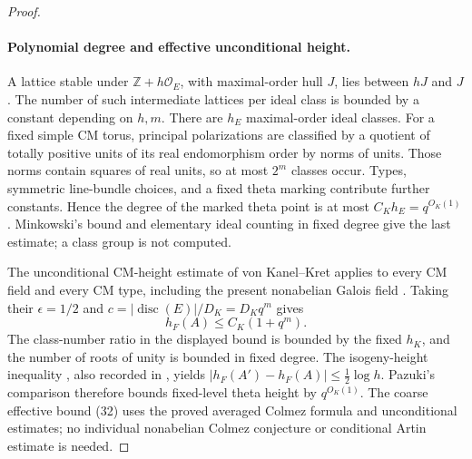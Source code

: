 \documentclass[11pt]{article}
\theoremstyle{definition}
\theoremstyle{remark}
\begin{document}
\begin{proof}
\paragraph{Polynomial degree and effective unconditional height.}
A lattice stable under $\mathbb Z+h\mathcal O_E$, with maximal-order hull
$J$, lies between $hJ$ and $J$.  The number of such intermediate lattices
per ideal class is bounded by a constant depending on $h,m$.  There are
$h_E$ maximal-order ideal classes.  For a fixed simple CM torus, principal
polarizations are classified by a quotient of totally positive units of its
real endomorphism order by norms of units.  Those norms contain squares of
real units, so at most $2^m$ classes occur.  Types, symmetric line-bundle
choices, and a fixed theta marking contribute further constants.  Hence the
degree of the marked theta point is at most $C_Kh_E=q^{O_K(1)}$.
Minkowski's bound and elementary ideal counting in fixed degree give the
last estimate; a class group is not computed.

The unconditional CM-height estimate of von Kanel--Kret applies to every
CM field and every CM type, including the present nonabelian Galois field
\cite[Section 7.2.1, (7.7), Lemma 7.10, pp.~62--63]{VonKanelKret2023}.
Taking their $\epsilon=1/2$ and
$c=|\operatorname{disc}(E)|/D_K=D_Kq^m$ gives
\[
 h_F(A)\leq C_K(1+q^m).
\]
The class-number ratio in the displayed bound is bounded by the fixed
$h_K$, and the number of roots of unity is bounded in fixed degree.
The isogeny-height inequality
\cite[(7.11), p.~67]{VonKanelKret2023}, also recorded in
\cite[Remark 2.3, p.~27]{Pazuki2012}, yields
$|h_F(A')-h_F(A)|\leq\tfrac12\log h$.
Pazuki's comparison \cite[Corollary 1.3, pp.~21--22]{Pazuki2012} therefore
bounds fixed-level theta height by $q^{O_K(1)}$.
The coarse effective bound (32) uses the proved averaged Colmez formula
and unconditional estimates; no individual nonabelian Colmez conjecture
or conditional Artin estimate is needed.


\end{proof}
\end{document}
